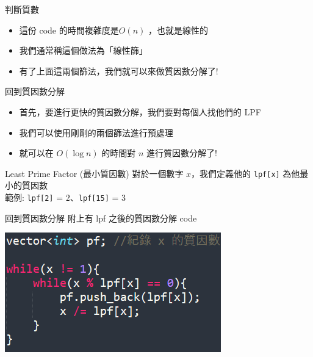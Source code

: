 \documentclass[aspectratio=169]{beamer}
\begin{document}
\begin{frame}[fragile]{判斷質數}
    \begin{itemize}
        \item<1-> 這份 code 的時間複雜度是$O(n)$ ，也就是線性的
        \item<2-> 我們通常稱這個做法為「線性篩」
        \item<3-> 有了上面這兩個篩法，我們就可以來做質因數分解了!
    \end{itemize}
\end{frame}

\begin{frame}{回到質因數分解}
    \begin{itemize}
        \item<1-> 首先，要進行更快的質因數分解，我們要對每個人找他們的 LPF
        \item<2-> 我們可以使用剛剛的兩個篩法進行預處理
        \item<2-> 就可以在 $O(\log n)$ 的時間對 $n$ 進行質因數分解了!
    \end{itemize}
    \begin{alertblock}{Least Prime Factor (最小質因數)}
        對於一個數字 $x$，我們定義他的 \texttt{lpf[x]} 為他最小的質因數 \\
        \vspace{5mm}
        範例: \texttt{lpf[2]} = $2$、\texttt{lpf[15]} = $3$
    \end{alertblock}
\end{frame}

\begin{frame}{回到質因數分解}
    附上有 lpf 之後的質因數分解 code
    \begin{center}
        \includegraphics[]{images/code11.png}
    \end{center}
\end{frame}
\end{document}
